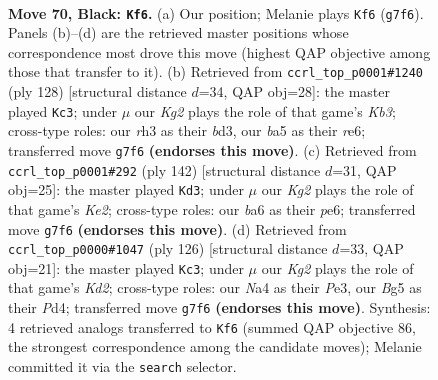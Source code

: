 \documentclass[11pt]{article}
\begin{document}
\clearpage

\begin{figure}[p]\centering
\begin{subfigure}{0.46\textwidth}\centering
\resizebox{\linewidth}{!}{%
\newchessgame
\chessboard[
  setfen={8/6k1/B2p3p/B3p1b1/n3P2p/1r3P1R/5K2/8 b - - 10 70},
  showmover=false,
  pgfstyle=straightmove, color=movearrow, markmove={g7-f6}
]}
\caption{}
\end{subfigure}\hfill
\begin{subfigure}{0.46\textwidth}\centering
\resizebox{\linewidth}{!}{%
\newchessgame
\chessboard[
  setfen={2k5/2p2R2/p3r3/P7/2PB4/1K1bP3/8/8 w - - 27 65},
  showmover=false,
  pgfstyle=straightmove, color=movearrow, markmove={b3-c3}
]}
\caption{}
\end{subfigure}
\\[4pt]
\begin{subfigure}{0.46\textwidth}\centering
\resizebox{\linewidth}{!}{%
\newchessgame
\chessboard[
  setfen={4B3/8/3kp3/1R3p2/6p1/1Pb1P1P1/4KP2/1r6 w - - 18 72},
  showmover=false,
  pgfstyle=straightmove, color=movearrow, markmove={e2-d3}
]}
\caption{}
\end{subfigure}\hfill
\begin{subfigure}{0.46\textwidth}\centering
\resizebox{\linewidth}{!}{%
\newchessgame
\chessboard[
  setfen={5n2/4R1pk/2r2p2/2Bp3P/3P2P1/4P3/3K4/8 w - - 3 64},
  showmover=false,
  pgfstyle=straightmove, color=movearrow, markmove={d2-c3}
]}
\caption{}
\end{subfigure}
\caption{\textbf{Move 70, Black: \texttt{Kf6}.} (a) Our position; Melanie plays \texttt{Kf6} (\texttt{g7f6}). Panels (b)--(d) are the retrieved master positions whose correspondence most drove this move (highest QAP objective among those that transfer to it). (b) Retrieved from \texttt{ccrl\_top\_p0001\#1240} (ply 128) [structural distance $d$=34, QAP obj=28]: the master played \texttt{Kc3}; under $\mu$ our \emph{Kg2} plays the role of that game's \emph{Kb3}; cross-type roles: our \emph{r}h3 as their \emph{b}d3, our \emph{b}a5 as their \emph{r}e6; transferred move \texttt{g7f6} \textbf{(endorses this move)}. (c) Retrieved from \texttt{ccrl\_top\_p0001\#292} (ply 142) [structural distance $d$=31, QAP obj=25]: the master played \texttt{Kd3}; under $\mu$ our \emph{Kg2} plays the role of that game's \emph{Ke2}; cross-type roles: our \emph{b}a6 as their \emph{p}e6; transferred move \texttt{g7f6} \textbf{(endorses this move)}. (d) Retrieved from \texttt{ccrl\_top\_p0000\#1047} (ply 126) [structural distance $d$=33, QAP obj=21]: the master played \texttt{Kc3}; under $\mu$ our \emph{Kg2} plays the role of that game's \emph{Kd2}; cross-type roles: our \emph{N}a4 as their \emph{P}e3, our \emph{B}g5 as their \emph{P}d4; transferred move \texttt{g7f6} \textbf{(endorses this move)}. Synthesis: 4 retrieved analogs transferred to \texttt{Kf6} (summed QAP objective 86, the strongest correspondence among the candidate moves); Melanie committed it via the \texttt{search} selector.}
\label{fig:thought-m139}
\end{figure}
\end{document}
